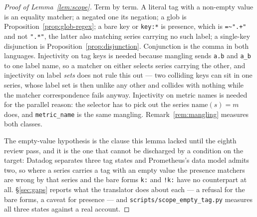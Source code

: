 \begin{proof}[Proof of Lemma~\ref{lem:scope}]
Term by term. A literal tag with a non-empty value is an equality matcher; a negated one
its negation; a glob is
Proposition~\ref{prop:glob-regex}; a bare key or \texttt{key:*} is presence, which is
\texttt{=\textasciitilde{}".+"} and not \texttt{".*"}, the latter also matching series
carrying no such label; a single-key disjunction is
Proposition~\ref{prop:disjunction}. Conjunction is the comma in both languages.
Injectivity on tag keys is needed because mangling sends \texttt{a.b} and \texttt{a\_b}
to one label name, so a matcher on either selects series carrying the other, and
injectivity on label \emph{sets} does not rule this out --- two colliding keys can sit in
one series, whose label set is then unlike any other and collides with nothing while the
matcher correspondence fails anyway. Injectivity on metric names is needed for the
parallel reason: the selector has to pick out the series $\mathrm{name}(s)=m$ does, and
\texttt{metric\_name} is the same mangling.
Remark~\ref{rem:mangling} measures both classes.

The empty-value hypothesis is the clause this lemma lacked until the eighth review pass,
and it is the one that cannot be discharged by a condition on the target: Datadog
separates three tag states and Prometheus's data model admits two, so where a series
carries a tag with an empty value the presence matchers are wrong by that series and the
bare forms \texttt{k:} and \texttt{!k:} have no counterpart at all.
\S\ref{sec:gaps} reports what the translator does about each --- a refusal for the bare
forms, a caveat for presence --- and \texttt{scripts\slash scope\_empty\_tag.py} measures
all three states against a real account.
\end{proof}
